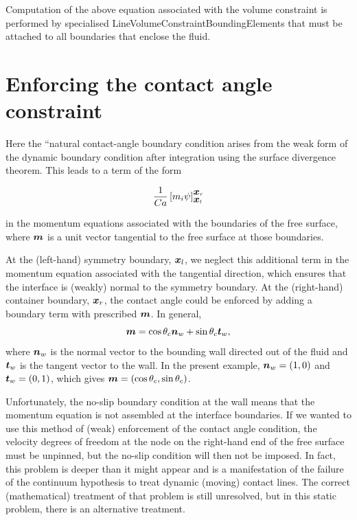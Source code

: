 Computation of the above equation associated with the volume constraint is performed by specialised {\ttfamily Line\+Volume\+Constraint\+Bounding\+Elements} that must be attached to all boundaries that enclose the fluid.\hypertarget{index_contact_angle}{}\section{Enforcing the contact angle constraint}\label{index_contact_angle}
Here the ``natural\textquotesingle{}\textquotesingle{} contact-\/angle boundary condition arises from the weak form of the dynamic boundary condition after integration using the surface divergence theorem. This leads to a term of the form

\[ \frac{1}{Ca} \left[m_{i}\psi\right]_{\mbox{\boldmath$x$}_l}^{\mbox{\boldmath$x$}_{r}} \]

in the momentum equations associated with the boundaries of the free surface, where $ \mbox{\boldmath$m$} $ is a unit vector tangential to the free surface at those boundaries.

At the (left-\/hand) symmetry boundary, $ \mbox{\boldmath$x$}_{l} $, we neglect this additional term in the momentum equation associated with the tangential direction, which ensures that the interface is (weakly) normal to the symmetry boundary. At the (right-\/hand) container boundary, $ \mbox{\boldmath$x$}_{r} $, the contact angle could be enforced by adding a boundary term with prescribed $ \mbox{\boldmath$m$} $. In general, \[ \mbox{\boldmath$m$} = \cos\theta_{c} \mbox{\boldmath$n$}_{w} + \sin\theta_{c} \mbox{\boldmath$t$}_{w}, \] where $ \mbox{\boldmath$n$}_{w} $ is the normal vector to the bounding wall directed out of the fluid and $ \mbox{\boldmath$t$}_{w} $ is the tangent vector to the wall. In the present example, $ \mbox{\boldmath$n$}_{w} = (1,0) $ and $ \mbox{\boldmath$t$}_{w} = (0,1) $, which gives $ \mbox{\boldmath$m$} = (\cos\theta_{c}, \sin\theta_{c}) $.

Unfortunately, the no-\/slip boundary condition at the wall means that the momentum equation is not assembled at the interface boundaries. If we wanted to use this method of (weak) enforcement of the contact angle condition, the velocity degrees of freedom at the node on the right-\/hand end of the free surface must be unpinned, but the no-\/slip condition will then not be imposed. In fact, this problem is deeper than it might appear and is a manifestation of the failure of the continuum hypothesis to treat dynamic (moving) contact lines. The correct (mathematical) treatment of that problem is still unresolved, but in this static problem, there is an alternative treatment.

